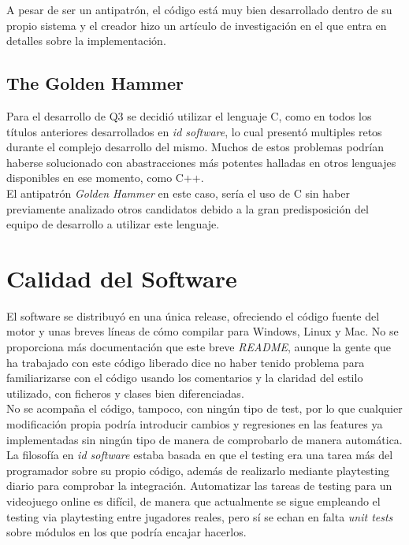 \documentclass[a4paper,12pt]{report}
\begin{document}
A pesar de ser un antipatrón, el código está muy bien desarrollado dentro de su propio sistema y el creador hizo un artículo de investigación en el que entra en detalles sobre la implementación.\cite{quake3}\\

\subsection{The Golden Hammer}

Para el desarrollo de Q3 se decidió utilizar el lenguaje C, como en todos los títulos anteriores desarrollados en \textit{id software}, lo cual presentó multiples retos durante el complejo desarrollo del mismo. Muchos de estos problemas podrían haberse solucionado con abastracciones más potentes halladas en otros lenguajes disponibles en ese momento, como C++.\\

El antipatrón \textit{Golden Hammer} en este caso, sería el uso de C sin haber previamente analizado otros candidatos debido a la gran predisposición del equipo de desarrollo a utilizar este lenguaje.\\

	
	\section{Calidad del Software}
    El software se distribuyó en una única release, ofreciendo el código fuente del motor y unas breves líneas de cómo compilar para Windows, Linux y Mac. No se proporciona más documentación que este breve \textit{README}, aunque la gente que ha trabajado con este código liberado dice no haber tenido problema para familiarizarse con el código usando los comentarios y la claridad del estilo utilizado, con ficheros y clases bien diferenciadas.\\
    
    No se acompaña el código, tampoco, con ningún tipo de test, por lo que cualquier modificación propia podría introducir cambios y regresiones en las features ya implementadas sin ningún tipo de manera de comprobarlo de manera automática. La filosofía en \textit{id software} estaba basada en que el testing era una tarea más del programador sobre su propio código, además de realizarlo mediante playtesting diario para comprobar la integración. Automatizar las tareas de testing para un videojuego online es difícil, de manera que actualmente se sigue empleando el testing via playtesting entre jugadores reales, pero sí se echan en falta \textit{unit tests} sobre módulos en los que podría encajar hacerlos.\\
    
\end{document}
